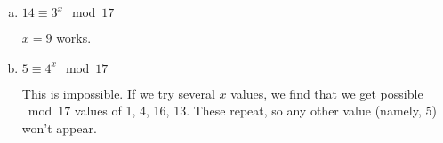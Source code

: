 \documentclass[12pt]{amsart}
\theoremstyle{plain}
\theoremstyle{definition}
\begin{document}
\begin{enumerate}[1.]
		\begin{enumerate}[a.]
			\item $14 \equiv 3^x \mod 17$
			\begin{framed}
			$x = 9$ works.
			\end{framed}
			 \item $5 \equiv 4^x \mod 17$
			\begin{framed}
			This is impossible.  If we try several $x$ values, we find that we get possible $\bmod 17$ values of 1, 4, 16, 13.  These repeat, so any other value (namely, 5) won't appear.
			\end{framed}
		\end{enumerate}
\end{enumerate}

	
\end{document}
